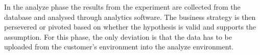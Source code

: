 \documentclass[english]{tktltiki2}
\theoremstyle{definition}
\theoremstyle{remark}
\begin{document}
In the analyze phase the results from the experiment are collected from the database and analysed through analytics software. The business strategy is then persevered or pivoted based on whether the hypothesis is valid and supports the assumption. For this phase, the only deviation is that the data has to be uploaded from the customer's environment into the analyze environment.






















\end{document}

